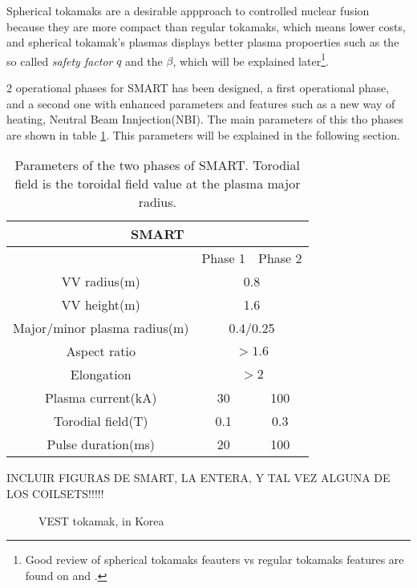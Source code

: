 \documentclass[a4paper,12pt,oneside]{book}
\begin{document}
Spherical tokamaks are a desirable appproach to controlled nuclear fusion because they are more compact than regular tokamaks, which means lower costs, and spherical tokamak's plasmas displays better plasma propoerties such as the so called  \textit{safety factor} $q$ and the $\beta$, which will be explained later\footnote{Good review of spherical tokamaks feauters vs regular tokamaks features are found on \cite{comparison} and \cite{ST_vs_T}.}.


2 operational phases for SMART has been designed, a first operational phase, and a second one with enhanced parameters and features such as a new way of heating, Neutral Beam Innjection(NBI). The main parameters of this tho phases are shown in table \ref{table_SMART_parameters}. This parameters will be explained in the following section.


\begin{table}
\centering
	\begin{tabular}{|c|c|c|} \hline
		\multicolumn{3}{|c|}{SMART}\\ \hline
		& Phase 1 & Phase 2 \\ \hline
		VV radius(m) & \multicolumn{2}{|c|}{0.8} \\ \hline
		VV height(m) & \multicolumn{2}{|c|}{1.6} \\ \hline
		Major/minor plasma radius(m) & \multicolumn{2}{|c|}{0.4/0.25} \\ \hline
		Aspect ratio & \multicolumn{2}{|c|}{$>1.6$} \\ \hline		
		Elongation & \multicolumn{2}{|c|}{$>2$} \\ \hline
		Plasma current(kA) & 30 & 100  \\ \hline
		Torodial field(T) & 0.1 & 0.3  \\ \hline
		Pulse duration(ms) & 20 & 100 \\ \hline
					\end{tabular}
	\caption{Parameters of the two phases of SMART. Torodial field is the toroidal field value at the plasma major radius.}
	\label{table_SMART_parameters}
\end{table}






INCLUIR FIGURAS DE SMART, LA ENTERA, Y TAL VEZ ALGUNA DE LOS COILSETS!!!!!

\begin{figure}
\centering
{}
\hfill
{}
\caption{VEST tokamak, in Korea}
\label{vest}
\end{figure}
\end{document}
